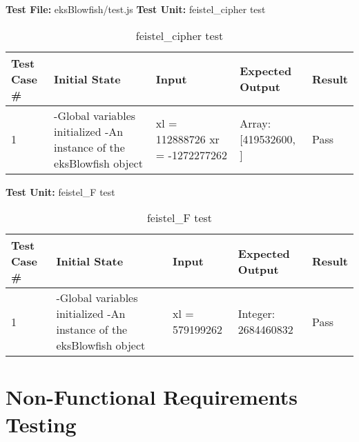 \documentclass[12pt]{article}
\begin{document}
    \noindent\textbf{Test File:} eksBlowfish/test.js \newline
     \textbf{Test Unit:} feistel\_cipher test \newline
    \begin{table}[H]
    \centering
          \caption{feistel\_cipher test}
            \label{tab:table2}
          \begin{tabular}{ | p{1cm} | p{5cm} | p{4cm} | p{3cm} | p{1.2cm} | }
            \hline
                \textbf{Test Case \#} & \textbf{Initial State} & \textbf{Input} & \textbf{Expected \newline Output} & \textbf{Result} \\
            \hline
              1 &   -Global variables initialized \newline -An instance of the eksBlowfish object & xl = 112888726 \newline xr = -1272277262 & Array: [419532600, \newline 26624517] & Pass \\
            \hline


          \end{tabular}
      \end{table}


      \break

       \textbf{Test Unit:} feistel\_F test \newline
      \begin{table}[H]
      \centering
            \caption{feistel\_F test}
              \label{tab:table2}
            \begin{tabular}{ | p{1cm} | p{5cm} | p{4cm} | p{3cm} | p{1.2cm} | }
              \hline
                  \textbf{Test Case \#} & \textbf{Initial State} & \textbf{Input} & \textbf{Expected \newline Output} & \textbf{Result} \\
              \hline
                1 &   -Global variables initialized \newline -An instance of the eksBlowfish object & xl = 579199262  & Integer: 2684460832 & Pass \\
              \hline


            \end{tabular}
        \end{table}



\section{Non-Functional Requirements Testing}
\end{document}
